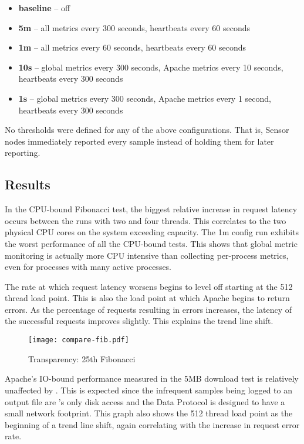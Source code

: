 \begin{itemize}
\item \textbf{baseline} -- \dcamp off
\item \textbf{5m} -- all metrics every 300 seconds, heartbeats every 60 seconds
\item \textbf{1m} -- all metrics every 60 seconds, heartbeats every 60 seconds
\item \textbf{10s} -- global metrics every 300 seconds, Apache metrics every 10 seconds, heartbeats every 300 seconds
\item \textbf{1s} -- global metrics every 300 seconds, Apache metrics every 1 second, heartbeats every 300 seconds
\end{itemize}

No thresholds were defined for any of the above configurations. That is, Sensor nodes immediately reported every sample
instead of holding them for later reporting.

\subsection{Results}

In the CPU-bound Fibonacci test, the biggest relative increase in request latency occurs between the runs with two and
four threads. This correlates to the two physical CPU cores on the system exceeding capacity. The 1m config run exhibits
the worst performance of all the CPU-bound tests. This shows that global metric monitoring is actually more CPU
intensive than collecting per-process metrics, even for processes with many active processes.

The rate at which request latency worsens begins to level off starting at the 512 thread load point. This is also the
load point at which Apache begins to return errors. As the percentage of requests resulting in errors increases, the
latency of the successful requests improves slightly. This explains the trend line shift.

\begin{figure}[H]
    \centering
    \vspace{-20pt}
    \texttt{[image: compare-fib.pdf]}
    \vspace{-50pt}
    \caption{Transparency: 25th Fibonacci}
    \label{fig:fib25_graph}
\end{figure}

Apache's IO-bound performance measured in the 5MB download test is relatively unaffected by \dcampns. This is expected
since the infrequent samples being logged to an output file are \dcampns's only disk access and the Data Protocol is
designed to have a small network footprint. This graph also shows the 512 thread load point as the beginning of a trend
line shift, again correlating with the increase in request error rate.

